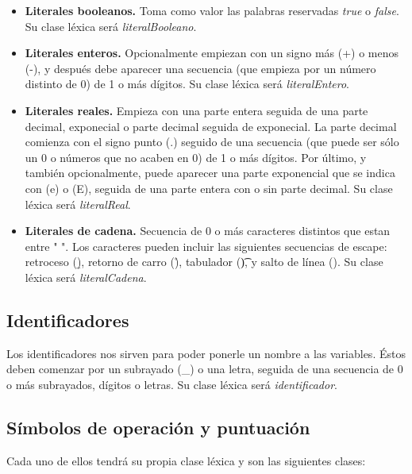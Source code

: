 \begin{itemize}
    \item \textbf{Literales booleanos.} Toma como valor las palabras reservadas \textit{true} o \textit{false}. Su clase léxica será
        \textit{literalBooleano}.
    \item \textbf{Literales enteros.} Opcionalmente empiezan con un signo más (+) o menos (-), y después debe aparecer una
        secuencia (que empieza por un número distinto de 0) de 1 o más dígitos. Su clase léxica será \textit{literalEntero}.
    \item \textbf{Literales reales.} Empieza con una parte entera seguida de una parte decimal, exponecial o parte decimal seguida de exponecial. La parte decimal comienza con el signo punto (.) seguido de una secuencia (que puede ser sólo un 0 o números que no acaben en 0) de 1 o más dígitos. Por último, y también opcionalmente, puede aparecer una parte exponencial que se indica con (e) o (E), seguida de una parte entera con o sin parte decimal. Su clase léxica será \textit{literalReal}.
    \item \textbf{Literales de cadena.} Secuencia de 0 o más caracteres distintos que estan entre "  ". Los caracteres pueden incluir las siguientes secuencias de
    escape: retroceso (\b), retorno de carro (\r), tabulador (\t), y salto de línea (\n). Su clase léxica será \textit{literalCadena}.
\end{itemize}

\subsection{Identificadores}

Los identificadores nos sirven para poder ponerle un nombre a las variables. Éstos deben comenzar por un subrayado (\_) o una letra, seguida de una secuencia de 0 o más
subrayados, dígitos o letras. Su clase léxica será \textit{identificador}.

\subsection{Símbolos de operación y puntuación}

Cada uno de ellos tendrá su propia clase léxica y son las siguientes clases:

